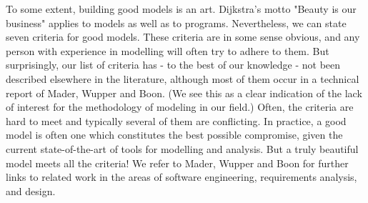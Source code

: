 To some extent, building good models is an art. Dijkstra's motto "Beauty is our business" applies to models as well as to programs. Nevertheless, we can state seven criteria for good models. These criteria are in some sense obvious, and any person with experience in modelling will often try to adhere to them. But surprisingly, our list of criteria has - to the best of our knowledge - not been described elsewhere in the literature, although most of them occur in a technical report of Mader, Wupper and Boon. (We see this as a clear indication of the lack of interest for the methodology of modeling in our field.) Often, the criteria are hard to meet and typically several of them are conflicting. In practice, a good model is often one which constitutes the best possible compromise, given the current state-of-the-art of tools for modelling and analysis. But a truly beautiful model meets all the criteria! We refer to Mader, Wupper and Boon for further links to related work in the areas of software engineering, requirements analysis, and design.

